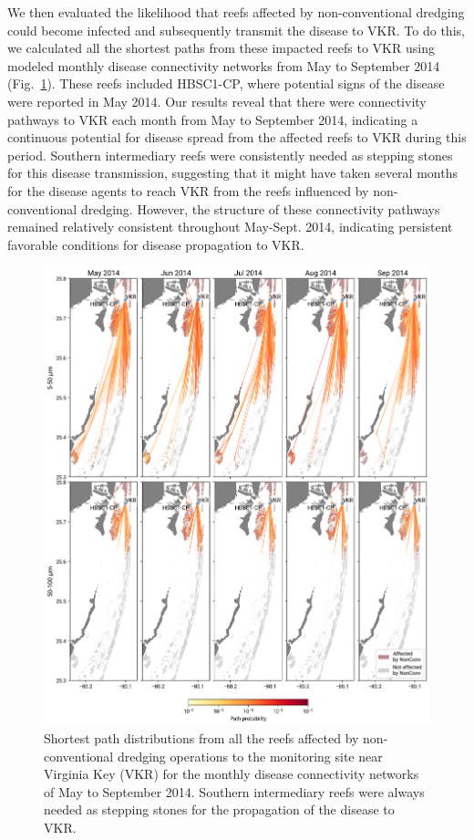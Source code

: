 \documentclass[preprint,12pt,authoryear]{elsarticle}
\begin{document}
We then evaluated the likelihood that reefs affected by non-conventional dredging could become infected and subsequently transmit the disease to VKR. To do this, we calculated all the shortest paths from these impacted reefs to VKR using modeled monthly disease connectivity networks from May to September 2014 (Fig.~\ref{fig:onset_path}). These reefs included HBSC1-CP, where potential signs of the disease were reported in May 2014. Our results reveal that there were connectivity pathways to VKR each month from May to September 2014, indicating a continuous potential for disease spread from the affected reefs to VKR during this period. Southern intermediary reefs were consistently needed as stepping stones for this disease transmission, suggesting that it might have taken several months for the disease agents to reach VKR from the reefs influenced by non-conventional dredging. However, the structure of these connectivity pathways remained relatively consistent throughout May-Sept. 2014, indicating persistent favorable conditions for disease propagation to VKR.

\begin{figure}
	\centering
	\includegraphics[width=\textwidth]{figures/figure_new_shortest_paths.png}
    \caption{Shortest path distributions from all the reefs affected by non-conventional dredging operations to the monitoring site near Virginia Key (VKR) for the monthly disease connectivity networks of May to September 2014. Southern intermediary reefs were always needed as stepping stones for the propagation of the disease to VKR.}
	\label{fig:onset_path}
\end{figure}
\end{document}
